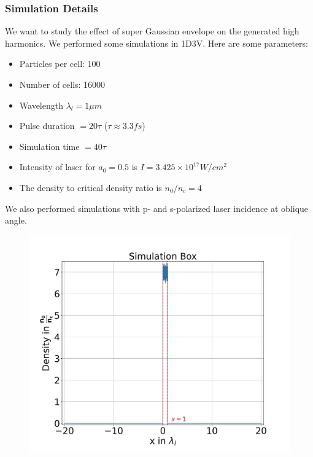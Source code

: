 \documentclass{beamer}
\begin{document}
\begin{frame}
    \frametitle{Simulation Details}
    \small
    We want to study the effect of super Gaussian envelope on the generated high harmonics. We performed some simulations in 1D3V. Here are some parameters:

    \begin{minipage}[t]{0.48\linewidth}
        \begin{itemize}
            \item Particles per cell: 100
            \item Number of cells: 16000
            \item Wavelength $\lambda_l = 1 \mu m$
            \item Pulse duration $= 20 \tau$ ($\tau\approx 3.3 fs$)
            \item Simulation time $= 40 \tau$
            \item Intensity of laser for $a_0 = 0.5$ is $I = 3.425 \times 10^{17} W/cm^2$
            \item The density to critical density ratio is $n_0/n_c = 4$
        \end{itemize}
        We also performed simulations with p- and s-polarized laser incidence at oblique angle.
    \end{minipage}
    \begin{minipage}[t]{0.48\linewidth}
        \begin{figure}
            \centering
            \includegraphics[width=1.0\textwidth, height=0.62\textheight]{images/plasma.jpg}
            \label{fig:plasma}
        \end{figure}
    \end{minipage}
\end{frame}
\end{document}
